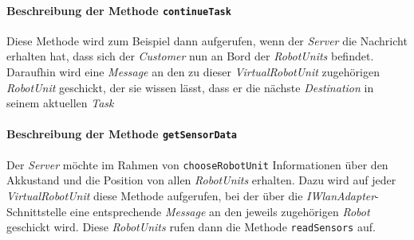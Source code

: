 			\paragraph{Beschreibung der Methode \texttt{continueTask}}
			Diese Methode wird zum Beispiel dann aufgerufen, wenn der \textit{Server} die Nachricht erhalten hat, dass sich der \textit{Customer} nun an Bord der \textit{RobotUnits} befindet. Daraufhin wird eine \textit{Message} an den zu dieser \textit{VirtualRobotUnit} zugehörigen \textit{RobotUnit} geschickt, der sie wissen lässt, dass er die nächste \textit{Destination} in seinem aktuellen \textit{Task}			
			
			\paragraph{Beschreibung der Methode \texttt{getSensorData}}
			Der \textit{Server} möchte im Rahmen von \texttt{chooseRobotUnit} Informationen über den Akkustand und die Position von allen \textit{RobotUnits} erhalten. Dazu wird auf jeder \textit{VirtualRobotUnit} diese Methode aufgerufen, bei der über die \textit{IWlanAdapter}-Schnittstelle eine entsprechende \textit{Message} an den jeweils zugehörigen \textit{Robot} geschickt wird. Diese \textit{RobotUnits} rufen dann die Methode \texttt{readSensors} auf.
